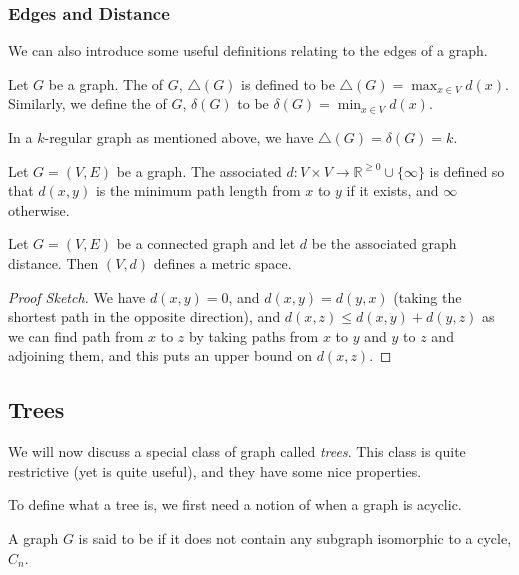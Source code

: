 \documentclass[a4paper]{scrartcl}
\begin{document}
\subsubsection{Edges and Distance}

We can also introduce some useful definitions relating to the edges of a graph.

\begin{definition}
	Let $G$ be a graph. The  of $G$, $\triangle(G)$ is defined to be $\triangle(G) = \max_{x \in V} d(x)$. Similarly, we define the  of $G$, $\delta(G)$ to be $\delta(G) = \min_{x \in V} d(x)$.
\end{definition}

In a $k$-regular graph as mentioned above, we have $\triangle(G) = \delta(G) = k$.

\begin{definition}
Let $G = (V, E)$ be a graph. The associated  $d: V \times V \rightarrow \mathbb{R}^{\geq 0} \cup \{ \infty \}$ is defined so that $d(x, y)$ is the minimum path length from $x$ to $y$ if it exists, and $\infty$ otherwise.
\end{definition}

\begin{proposition}
	Let $G = (V, E)$ be a connected graph and let $d$ be the associated graph distance. Then $(V, d)$ defines a metric space.
\end{proposition}
\begin{proof}[Proof Sketch]
	We have $d(x, y) = 0$, and $d(x, y) = d(y, x)$ (taking the shortest path in the opposite direction), and $d(x, z) \leq d(x, y) + d(y, z)$ as we can find path from $x$ to $z$ by taking paths from $x$ to $y$ and $y$ to $z$ and adjoining them, and this puts an upper bound on $d(x, z)$.
\end{proof}

\subsection{Trees}

We will now discuss a special class of graph called \emph{trees}.
This class is quite restrictive (yet is quite useful), and they have some nice properties.

To define what a tree is, we first need a notion of when a graph is acyclic.

\begin{definition}[Acyclic]
	A graph $G$ is said to be  if it does not contain any subgraph isomorphic to a cycle, $C_n$.
\end{definition}
\end{document}
